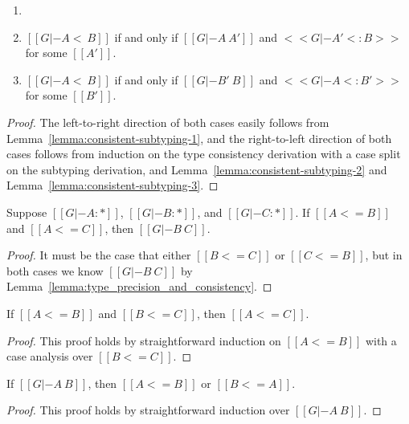 \begin{corollary}
  \label{corollary:consistent_subtyping}
  \begin{enumerate}[label=\roman*.,align=left]
  \item[]
  \item $[[G |- A <~ B]]$ if and only if $[[G |- A ~ A']]$ and $<<G |- A' <: B>>$ for some $[[A']]$.
  \item $[[G |- A <~ B]]$ if and only if $[[G |- B' ~ B]]$ and $<<G |- A <: B'>>$ for some $[[B']]$.
  \end{enumerate}
\end{corollary}
\begin{proof}
  The left-to-right direction of both cases easily follows from
  Lemma~\ref{lemma:consistent-subtyping-1}, and the right-to-left
  direction of both cases follows from induction on the type
  consistency derivation with a case split on the subtyping derivation,
  and Lemma~\ref{lemma:consistent-subtyping-2} and Lemma~\ref{lemma:consistent-subtyping-3}.
\end{proof}

\begin{lemma}
  \label{lemma:type_precision_triangle_consistenty}
  Suppose $[[G |- A : *]]$, $[[G |- B : *]]$, and $[[G |- C : *]]$.
  If $[[A <= B]]$ and $[[A <= C]]$, then $[[G |- B ~ C]]$.
\end{lemma}
\begin{proof}
  It must be the case that either $[[B <= C]]$ or $[[C <= B]]$, but in both cases
  we know $[[G |- B ~ C]]$ by Lemma~\ref{lemma:type_precision_and_consistency}.
\end{proof}

\begin{lemma}
  \label{lemma:transitivity_for_type_precision}
  If $[[A <= B]]$ and $[[B <= C]]$, then $[[A <= C]]$.
\end{lemma}
\begin{proof}
  This proof holds by straightforward induction on $[[A <= B]]$ with
  a case analysis over $[[B <= C]]$.
\end{proof}

\begin{lemma}
  \label{lemma:type_consistency_to_type_precision}
  If $[[G |- A ~ B]]$, then $[[A <= B]]$ or $[[B <= A]]$.
\end{lemma}
\begin{proof}
  This proof holds by straightforward induction over $[[G |- A ~ B]]$.
\end{proof}

